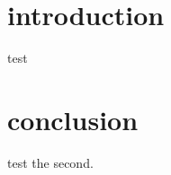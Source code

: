 %

\chapter{introduction}
test
\chapter{conclusion}
test the second.


%
% 
%
%
%
%

%
%



%
%
%


